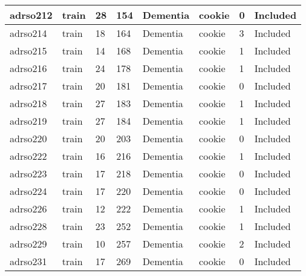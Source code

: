\begin{center}
\begin{longtable}{|l|l|l|l|l|l|l|l|}
adrso212  & train            & 28           & 154         & Dementia             & cookie          & 0                & Included      \\ \hline
adrso214  & train            & 18           & 164         & Dementia             & cookie          & 3                & Included      \\ \hline
adrso215  & train            & 14           & 168         & Dementia             & cookie          & 1                & Included      \\ \hline
adrso216  & train            & 24           & 178         & Dementia             & cookie          & 1                & Included      \\ \hline
adrso217  & train            & 20           & 181         & Dementia             & cookie          & 0                & Included      \\ \hline
adrso218  & train            & 27           & 183         & Dementia             & cookie          & 1                & Included      \\ \hline
adrso219  & train            & 27           & 184         & Dementia             & cookie          & 1                & Included      \\ \hline
adrso220  & train            & 20           & 203         & Dementia             & cookie          & 0                & Included      \\ \hline
adrso222  & train            & 16           & 216         & Dementia             & cookie          & 1                & Included      \\ \hline
adrso223  & train            & 17           & 218         & Dementia             & cookie          & 0                & Included      \\ \hline
adrso224  & train            & 17           & 220         & Dementia             & cookie          & 0                & Included      \\ \hline
adrso226  & train            & 12           & 222         & Dementia             & cookie          & 1                & Included      \\ \hline
adrso228  & train            & 23           & 252         & Dementia             & cookie          & 1                & Included      \\ \hline
adrso229  & train            & 10           & 257         & Dementia             & cookie          & 2                & Included      \\ \hline
adrso231  & train            & 17           & 269         & Dementia             & cookie          & 0                & Included      \\ \hline

\end{longtable}
\end{center}
